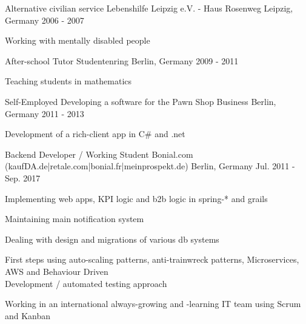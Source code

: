 


\begin{cventries}


\cventry
{Alternative civilian service} %
{Lebenshilfe Leipzig e.V. - Haus Rosenweg} %
{Leipzig, Germany} %
{2006 - 2007} %
{ %
\begin{cvitems}
\item {Working with mentally disabled people}
\end{cvitems}
}

\cventry
{After-school Tutor} %
{Studentenring} %
{Berlin, Germany} %
{2009 - 2011} %
{ %
\begin{cvitems}
\item {Teaching students in mathematics}
\end{cvitems}
}

\cventry
{Self-Employed} %
{Developing a software for the Pawn Shop Business} %
{Berlin, Germany} %
{2011 - 2013} %
{ %
\begin{cvitems}
\item {Development of a rich-client app in C\# and .net}
\end{cvitems}
}

\cventry
{Backend Developer / Working Student} %
{Bonial.com (kaufDA.de|retale.com|bonial.fr|meinprospekt.de)} %
{Berlin, Germany} %
{Jul. 2011 - Sep. 2017} %
{ %
\begin{cvitems}
\item {Implementing web apps, KPI logic and b2b logic in spring-* and grails}
\item {Maintaining main notification system}
\item {Dealing with design and migrations of various db systems}
\item {First steps using auto-scaling patterns, anti-trainwreck patterns, Microservices, AWS and Behaviour Driven \\ Development / automated testing approach}
\item {Working in an international always-growing and -learning IT team using Scrum and Kanban}
\end{cvitems}
}


\end{cventries}
